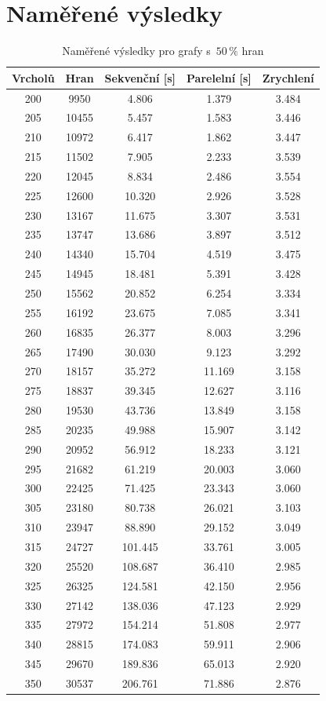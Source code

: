 \documentclass[12pt]{article}
\begin{document}
\section{Naměřené výsledky} \label{appendix:RawResults}

\begin{table}[H]
\begin{center}
\begin{tabular}{ c c c c c }
\toprule
Vrcholů & Hran & Sekvenční [s] & Parelelní [s] & Zrychlení\\\midrule
200 & 9950 & 4.806 & 1.379 & 3.484\\
205 & 10455 & 5.457 & 1.583 & 3.446\\
210 & 10972 & 6.417 & 1.862 & 3.447\\
215 & 11502 & 7.905 & 2.233 & 3.539\\
220 & 12045 & 8.834 & 2.486 & 3.554\\
225 & 12600 & 10.320 & 2.926 & 3.528\\
230 & 13167 & 11.675 & 3.307 & 3.531\\
235 & 13747 & 13.686 & 3.897 & 3.512\\
240 & 14340 & 15.704 & 4.519 & 3.475\\
245 & 14945 & 18.481 & 5.391 & 3.428\\
250 & 15562 & 20.852 & 6.254 & 3.334\\
255 & 16192 & 23.675 & 7.085 & 3.341\\
260 & 16835 & 26.377 & 8.003 & 3.296\\
265 & 17490 & 30.030 & 9.123 & 3.292\\
270 & 18157 & 35.272 & 11.169 & 3.158\\
275 & 18837 & 39.345 & 12.627 & 3.116\\
280 & 19530 & 43.736 & 13.849 & 3.158\\
285 & 20235 & 49.988 & 15.907 & 3.142\\
290 & 20952 & 56.912 & 18.233 & 3.121\\
295 & 21682 & 61.219 & 20.003 & 3.060\\
300 & 22425 & 71.425 & 23.343 & 3.060\\
305 & 23180 & 80.738 & 26.021 & 3.103\\
310 & 23947 & 88.890 & 29.152 & 3.049\\
315 & 24727 & 101.445 & 33.761 & 3.005\\
320 & 25520 & 108.687 & 36.410 & 2.985\\
325 & 26325 & 124.581 & 42.150 & 2.956\\
330 & 27142 & 138.036 & 47.123 & 2.929\\
335 & 27972 & 154.214 & 51.808 & 2.977\\
340 & 28815 & 174.083 & 59.911 & 2.906\\
345 & 29670 & 189.836 & 65.013 & 2.920\\
350 & 30537 & 206.761 & 71.886 & 2.876\\
\bottomrule
\end{tabular}
\end{center}
\caption{Naměřené výsledky pro grafy s~$50\,\%$ hran} 
\end{table}
\end{document}
